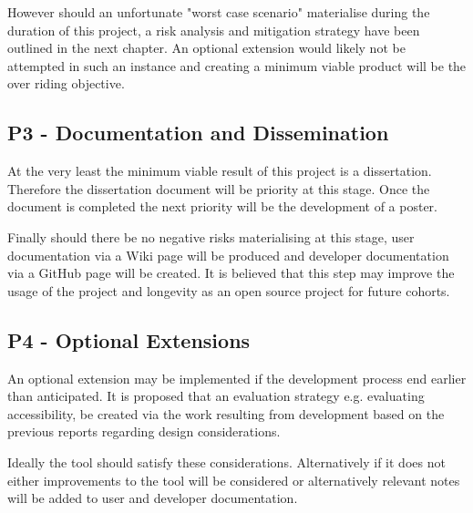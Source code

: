 However should an unfortunate "worst case scenario" materialise during the duration of this project, a risk analysis and mitigation strategy have been outlined in the next chapter. An optional extension would likely not be attempted in such an instance and creating a minimum viable product will be the over riding objective.

\subsection{P3 - Documentation and Dissemination}

At the very least the minimum viable result of this project is a dissertation. Therefore the dissertation document will be priority at this stage. Once the document is completed the next priority will be the development of a poster.

Finally should there be no negative risks materialising at this stage, user documentation via a Wiki page will be produced and developer documentation via a GitHub page will be created. It is believed that this step may improve the usage of the project and longevity as an open source project for future cohorts.

\subsection{P4 - Optional Extensions}
An optional extension may be implemented if the development process end earlier than anticipated. It is proposed that an evaluation strategy e.g. evaluating accessibility, be created via the work resulting from development based on the previous reports regarding design considerations.

Ideally the tool should satisfy these considerations. Alternatively if it does not either improvements to the tool will be considered or alternatively relevant notes will be added to user and developer documentation.





